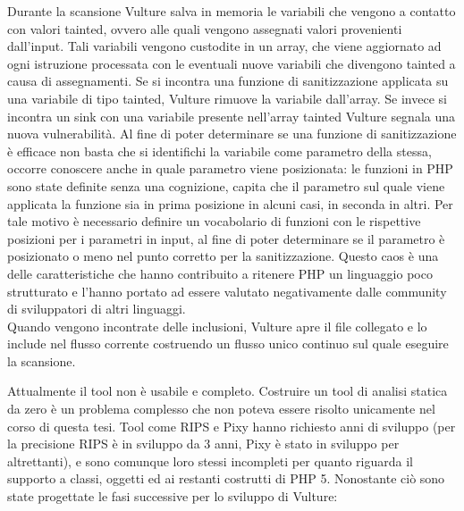 Durante la scansione Vulture salva in memoria le variabili che vengono a contatto con valori tainted, ovvero alle quali vengono assegnati valori provenienti dall'input. Tali variabili vengono custodite in un array, che viene aggiornato ad ogni istruzione processata con le eventuali nuove variabili che divengono tainted a causa di assegnamenti. Se si incontra una funzione di sanitizzazione applicata su una variabile di tipo tainted, Vulture rimuove la variabile dall'array. Se invece si incontra un sink con una variabile presente nell'array tainted Vulture segnala una nuova vulnerabilità. Al fine di poter determinare se una funzione di sanitizzazione è efficace non basta che si identifichi la variabile come parametro della stessa, occorre conoscere anche in quale parametro viene posizionata: le funzioni in PHP sono state definite senza una cognizione, capita che il parametro sul quale viene applicata la funzione sia in prima posizione in alcuni casi, in seconda in altri. Per tale motivo è necessario definire un vocabolario di funzioni con le rispettive posizioni per i parametri in input, al fine di poter determinare se il parametro è posizionato o meno nel punto corretto per la sanitizzazione. Questo caos è una delle caratteristiche che hanno contribuito a ritenere PHP un linguaggio poco strutturato e l'hanno portato ad essere valutato negativamente dalle community di sviluppatori di altri linguaggi\cite{codinghorror}.\\
Quando vengono incontrate delle inclusioni, Vulture apre il file collegato e lo include nel flusso corrente costruendo un flusso unico continuo sul quale eseguire la scansione.

Attualmente il tool non è usabile e completo. Costruire un tool di analisi statica da zero è un problema complesso che non poteva essere risolto unicamente nel corso di questa tesi. Tool come RIPS e Pixy hanno richiesto anni di sviluppo (per la precisione RIPS è in sviluppo da 3 anni, Pixy è stato in sviluppo per altrettanti), e sono comunque loro stessi incompleti per quanto riguarda il supporto a classi, oggetti ed ai restanti costrutti di PHP 5.
Nonostante ciò sono state progettate le fasi successive per lo sviluppo di Vulture:

